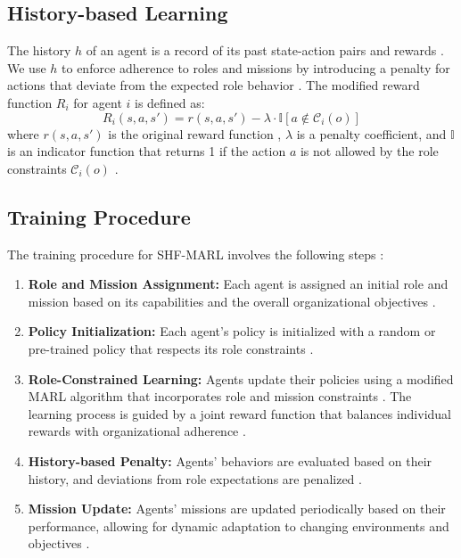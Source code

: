 \documentclass[sigconf,anonymous]{aamas}
\begin{document}
\subsection{History-based Learning}
The history $h$ of an agent is a record of its past state-action pairs and rewards \cite{foerster2018counterfactual}. We use $h$ to enforce adherence to roles and missions by introducing a penalty for actions that deviate from the expected role behavior \cite{wei2019safe}. The modified reward function $R_i$ for agent $i$ is defined as:
\[
R_i(s, a, s') = r(s, a, s') - \lambda \cdot \mathbb{I}[a \notin \mathcal{C}_i(o)]
\]
where $r(s, a, s')$ is the original reward function \cite{lowe2017multi}, $\lambda$ is a penalty coefficient, and $\mathbb{I}$ is an indicator function that returns 1 if the action $a$ is not allowed by the role constraints $\mathcal{C}_i(o)$ \cite{hubner2010moise}.

\subsection{Training Procedure}
The training procedure for SHF-MARL involves the following steps \cite{foerster2018counterfactual}:

\begin{enumerate}
    \item \textbf{Role and Mission Assignment:} Each agent is assigned an initial role and mission based on its capabilities and the overall organizational objectives \cite{hubner2010moise}.
    \item \textbf{Policy Initialization:} Each agent's policy is initialized with a random or pre-trained policy that respects its role constraints \cite{foerster2018counterfactual, hubner2010moise}.
    \item \textbf{Role-Constrained Learning:} Agents update their policies using a modified MARL algorithm that incorporates role and mission constraints \cite{hubner2010moise}. The learning process is guided by a joint reward function that balances individual rewards with organizational adherence \cite{lowe2017multi}.
    \item \textbf{History-based Penalty:} Agents' behaviors are evaluated based on their history, and deviations from role expectations are penalized \cite{wei2019safe}.
    \item \textbf{Mission Update:} Agents' missions are updated periodically based on their performance, allowing for dynamic adaptation to changing environments and objectives \cite{hubner2010moise, soule2024}.
\end{enumerate}
\end{document}
